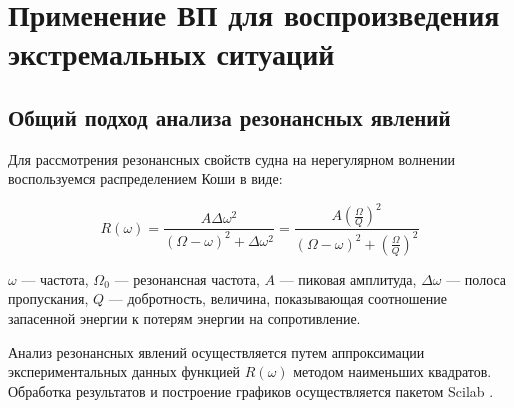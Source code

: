 \chapter{Применение ВП для воспроизведения экстремальных ситуаций}

\section{Общий подход анализа резонансных явлений}

Для рассмотрения резонансных свойств судна на нерегулярном волнении воспользуемся распределением Коши в виде:

\begin{equation}
	R(\omega) = \frac{A \Delta \omega^2} {  (\Omega-\omega)^2 + \Delta \omega^2 } 
		 = \frac{A \left( \frac{\Omega}{Q} \right) ^2} {  (\Omega-\omega)^2 + \left( \frac{\Omega}{Q} \right) ^2 } 
\end{equation}

$\omega$ --- частота, $\Omega_0$ --- резонансная частота, $A$ --- пиковая амплитуда, $\Delta \omega$ --- полоса пропускания, $Q$ --- добротность, величина, показывающая соотношение запасенной энергии к потерям энергии на сопротивление.

Анализ резонансных явлений осуществляется путем аппроксимации экспериментальных данных функцией $R(\omega)$ методом наименьших квадратов. Обработка результатов и построение графиков осуществляется пакетом Scilab \citep{scilab}.

